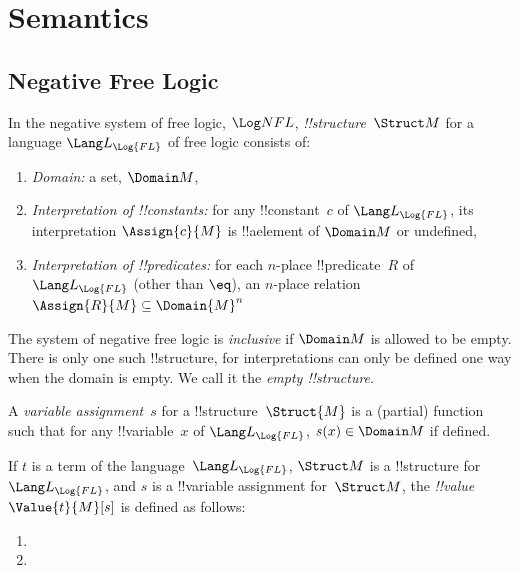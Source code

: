 \documentclass[../../../../include/open-logic-chapter]{subfiles}
\begin{document}

\section{Semantics}

\subsection{Negative Free Logic}

\begin{defn}[!!^{structure}s]
In the negative system of free logic, $\Log NFL$,
 \emph{!!{structure}}~$\Struct M$ for a language
$\Lang L_{\Log{FL}}$ of free logic consists of:
\begin{enumerate}
\item \emph{Domain:} a set, $\Domain M$,
\item \emph{Interpretation of !!{constant}s:} for any !!{constant}~$c$ of
  $\Lang L_{\Log{FL}}$, its interpretation $\Assign{c}{M}$ is !!a{element} of 
  $\Domain M$ or undefined,
\item \emph{Interpretation of !!{predicate}s:} for each $n$-place
  !!{predicate}~$R$ of $\Lang L_{\Log{FL}}$ (other than $\eq$), an $n$-place
  relation $\Assign{R}{M} \subseteq \Domain{M}^n$
\end{enumerate}
The system of negative free logic is \emph{inclusive} if $\Domain M$ is
allowed to be empty. There is only one such !!{structure}, for interpretations
can only be defined one way when the domain is empty. We call it the 
\emph{empty !!{structure}}.
\end{defn}

\begin{defn}
A \emph{variable assignment}~$s$ for a !!{structure}~$\Struct{M}$ is a
(partial) function such that for any !!{variable}~$x$ of
  $\Lang L_{\Log{FL}}$, $s(x) \in \Domain M$ if defined. 
\end{defn}

\begin{defn}
If $t$ is a term of the language~$\Lang L_{\Log{FL}}$, $\Struct M$ is a
!!{structure} for~$\Lang L_{\Log{FL}}$, and $s$ is a !!{variable} assignment
for~$\Struct M$, the \emph{!!{value}}~$\Value{t}{M}[s]$ is defined as
follows:
\begin{enumerate}
\item {}
\item {}
\end{enumerate}
\end{defn}
\end{document}
